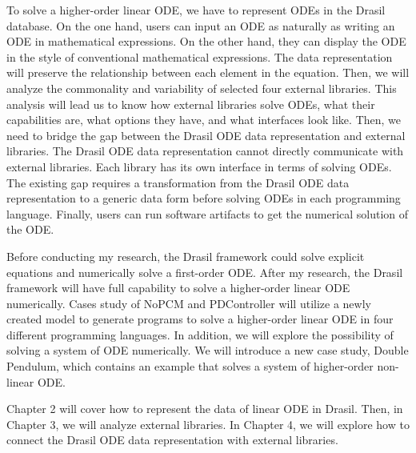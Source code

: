 To solve a higher-order linear ODE, we have to represent ODEs in the Drasil database. On the one hand, users can input an ODE as naturally as writing an ODE in mathematical expressions. On the other hand, they can display the ODE in the style of conventional mathematical expressions. The data representation will preserve the relationship between each element in the equation. Then, we will analyze the commonality and variability of selected four external libraries. This analysis will lead us to know how external libraries solve ODEs, what their capabilities are, what options they have, and what interfaces look like. Then, we need to bridge the gap between the Drasil ODE data representation and external libraries. The Drasil ODE data representation cannot directly communicate with external libraries. Each library has its own interface in terms of solving ODEs. The existing gap requires a transformation from the Drasil ODE data representation to a generic data form before solving ODEs in each programming language. Finally, users can run software artifacts to get the numerical solution of the ODE.

Before conducting my research, the Drasil framework could solve explicit equations and numerically solve a first-order ODE. After my research, the Drasil framework will have full capability to solve a higher-order linear ODE numerically. Cases study of NoPCM and PDController will utilize a newly created model to generate programs to solve a higher-order linear ODE in four different programming languages. In addition, we will explore the possibility of solving a system of ODE numerically. We will introduce a new case study, Double Pendulum, which contains an example that solves a system of higher-order non-linear ODE.

Chapter 2 will cover how to represent the data of linear ODE in Drasil. Then, in Chapter 3, we will analyze external libraries. In Chapter 4, we will explore how to connect the Drasil ODE data representation with external libraries.